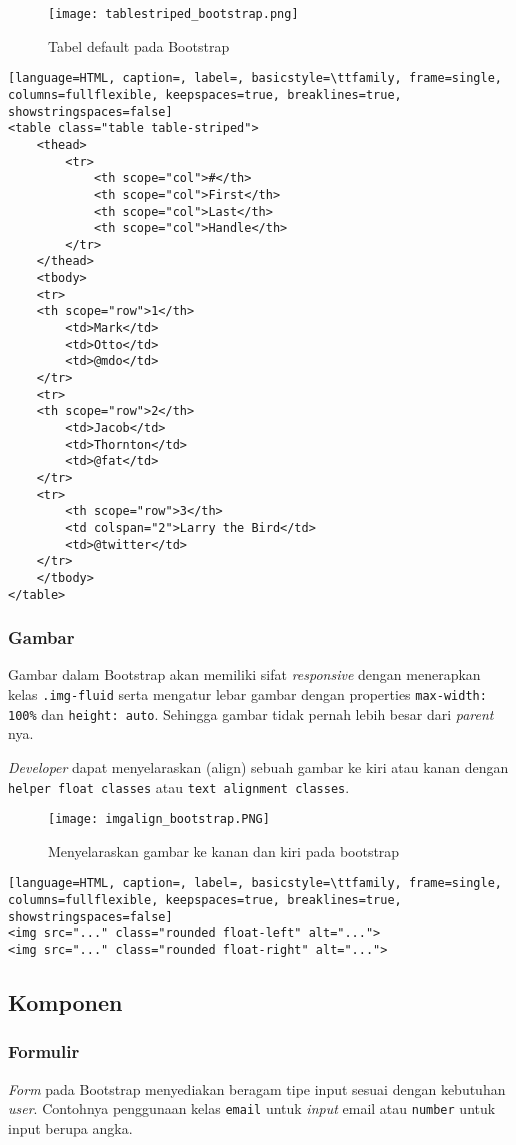 \begin{figure} [H]
	\centering  
	\texttt{[image: tablestriped\_bootstrap.png]}  
	\caption{Tabel default pada Bootstrap} 
\end{figure}

\begin{lstlisting}[language=HTML, caption=, label=, basicstyle=\ttfamily, frame=single, columns=fullflexible, keepspaces=true, breaklines=true, showstringspaces=false] 
<table class="table table-striped">
	<thead>
		<tr>
			<th scope="col">#</th>
			<th scope="col">First</th>
			<th scope="col">Last</th>
			<th scope="col">Handle</th>
		</tr>
	</thead>
	<tbody>
	<tr>
	<th scope="row">1</th>
		<td>Mark</td>
		<td>Otto</td>
		<td>@mdo</td>
	</tr>
	<tr>
	<th scope="row">2</th>
		<td>Jacob</td>
		<td>Thornton</td>
		<td>@fat</td>
	</tr>
	<tr>
		<th scope="row">3</th>
		<td colspan="2">Larry the Bird</td>
		<td>@twitter</td>
	</tr>
	</tbody>
</table>
\end{lstlisting}


\subsubsection{Gambar}
Gambar dalam Bootstrap akan memiliki sifat \textit{responsive} dengan menerapkan kelas \texttt{.img-fluid} serta mengatur lebar gambar dengan properties \texttt{max-width: 100\%} dan \texttt{height: auto}. Sehingga gambar tidak pernah lebih besar dari \textit{parent} nya. 

\textit{Developer} dapat menyelaraskan (align) sebuah gambar ke kiri atau kanan dengan \texttt{helper float classes} atau \texttt{text alignment classes}. 
\begin{figure} [H]
	\centering  
	\texttt{[image: imgalign\_bootstrap.PNG]}  
\caption{Menyelaraskan gambar ke kanan dan kiri pada bootstrap} 
\end{figure}
\begin{lstlisting}[language=HTML, caption=, label=, basicstyle=\ttfamily, frame=single, columns=fullflexible, keepspaces=true, breaklines=true, showstringspaces=false]
<img src="..." class="rounded float-left" alt="...">
<img src="..." class="rounded float-right" alt="...">
\end{lstlisting}



\subsection{Komponen}
\subsubsection{Formulir}
\textit{Form} pada Bootstrap menyediakan beragam tipe input sesuai dengan kebutuhan \textit{user}. Contohnya penggunaan kelas \texttt{email} untuk \textit{input} email atau \texttt{number} untuk input berupa angka.
